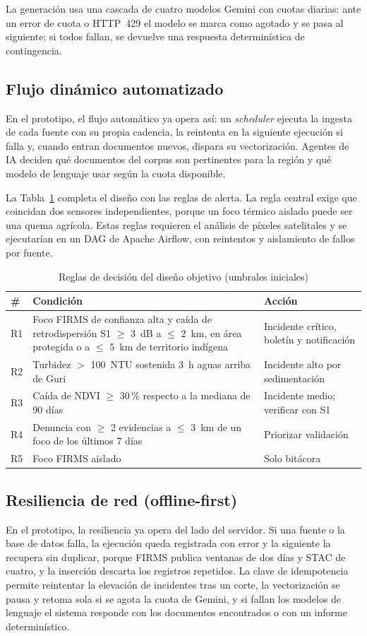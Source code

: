 \documentclass[conference]{IEEEtran}
\begin{document}
La generación usa una cascada de cuatro modelos Gemini con cuotas diarias: ante un error de cuota o HTTP~429 el modelo se marca como agotado y se pasa al siguiente; si todos fallan, se devuelve una respuesta determinística de contingencia.

\subsection{Flujo dinámico automatizado}
En el prototipo, el flujo automático ya opera así: un \emph{scheduler} ejecuta la ingesta de cada fuente con su propia cadencia, la reintenta en la siguiente ejecución si falla y, cuando entran documentos nuevos, dispara su vectorización. Agentes de IA deciden qué documentos del corpus son pertinentes para la región y qué modelo de lenguaje usar según la cuota disponible.

La Tabla~\ref{tab:reglas} completa el diseño con las reglas de alerta. La regla central exige que coincidan dos sensores independientes, porque un foco térmico aislado puede ser una quema agrícola. Estas reglas requieren el análisis de píxeles satelitales y se ejecutarían en un DAG de Apache Airflow, con reintentos y aislamiento de fallos por fuente.

\begin{table}[!t]
\caption{Reglas de decisión del diseño objetivo (umbrales iniciales)}
\label{tab:reglas}
\centering
\footnotesize
\setlength{\tabcolsep}{3pt}
\begin{tabular}{@{}l p{45mm} p{22mm}@{}}
\toprule
\# & Condición & Acción \\
\midrule
R1 & Foco FIRMS de confianza alta y caída de retrodispersión S1 $\geq$ 3~dB a $\leq$ 2~km, en área protegida o a $\leq$ 5~km de territorio indígena & Incidente crítico, boletín y notificación \\
R2 & Turbidez $>$ 100~NTU sostenida 3~h aguas arriba de Guri & Incidente alto por sedimentación \\
R3 & Caída de NDVI $\geq$ 30\,\% respecto a la mediana de 90 días & Incidente medio; verificar con S1 \\
R4 & Denuncia con $\geq$ 2 evidencias a $\leq$ 3~km de un foco de los últimos 7 días & Priorizar validación \\
R5 & Foco FIRMS aislado & Solo bitácora \\
\bottomrule
\end{tabular}
\end{table}

\subsection{Resiliencia de red (offline-first)}
En el prototipo, la resiliencia ya opera del lado del servidor. Si una fuente o la base de datos falla, la ejecución queda registrada con error y la siguiente la recupera sin duplicar, porque FIRMS publica ventanas de dos días y STAC de cuatro, y la inserción descarta los registros repetidos. La clave de idempotencia permite reintentar la elevación de incidentes tras un corte, la vectorización se pausa y retoma sola si se agota la cuota de Gemini, y si fallan los modelos de lenguaje el sistema responde con los documentos encontrados o con un informe determinístico.
\end{document}
